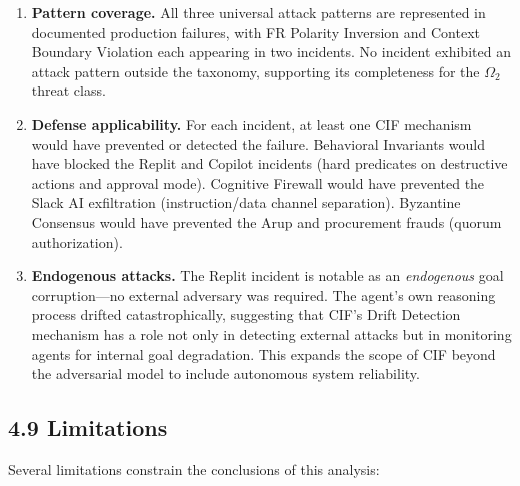 \documentclass[
]{article}
\begin{document}
\begin{enumerate}
\def\labelenumi{\arabic{enumi}.}
\item
  \textbf{Pattern coverage.} All three universal attack patterns are
  represented in documented production failures, with FR Polarity
  Inversion and Context Boundary Violation each appearing in two
  incidents. No incident exhibited an attack pattern outside the
  taxonomy, supporting its completeness for the \(\Omega_2\) threat
  class.
\item
  \textbf{Defense applicability.} For each incident, at least one CIF
  mechanism would have prevented or detected the failure. Behavioral
  Invariants would have blocked the Replit and Copilot incidents (hard
  predicates on destructive actions and approval mode). Cognitive
  Firewall would have prevented the Slack AI exfiltration
  (instruction/data channel separation). Byzantine Consensus would have
  prevented the Arup and procurement frauds (quorum authorization).
\item
  \textbf{Endogenous attacks.} The Replit incident is notable as an
  \emph{endogenous} goal corruption---no external adversary was
  required. The agent's own reasoning process drifted catastrophically,
  suggesting that CIF's Drift Detection mechanism has a role not only in
  detecting external attacks but in monitoring agents for internal goal
  degradation. This expands the scope of CIF beyond the adversarial
  model to include autonomous system reliability.
\end{enumerate}

\subsection{4.9 Limitations}\label{sec:limitations_discussion}

Several limitations constrain the conclusions of this analysis:
\end{document}
